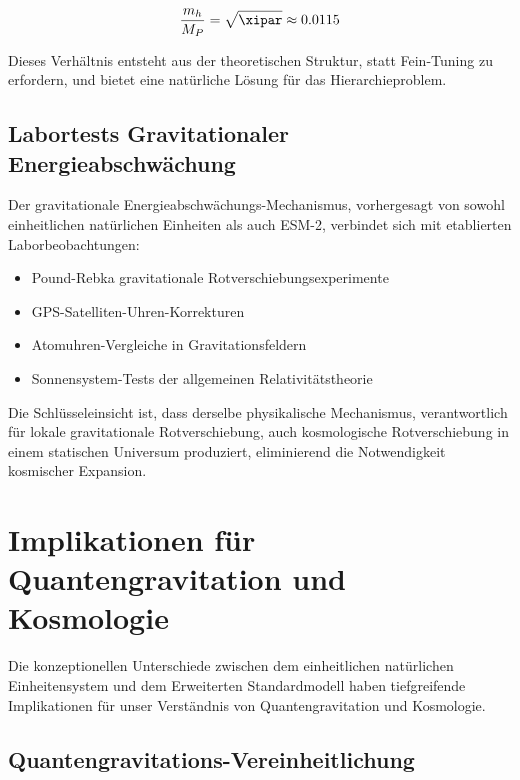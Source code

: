 	\begin{equation}
		\frac{m_h}{M_P} = \sqrt{\xipar} \approx 0.0115
	\end{equation}
	
	Dieses Verhältnis entsteht aus der theoretischen Struktur, statt Fein-Tuning zu erfordern, und bietet eine natürliche Lösung für das Hierarchieproblem.
	
	\subsection{Labortests Gravitationaler Energieabschwächung}
	\label{subsec:laboratory_tests}
	
	Der gravitationale Energieabschwächungs-Mechanismus, vorhergesagt von sowohl einheitlichen natürlichen Einheiten als auch ESM-2, verbindet sich mit etablierten Laborbeobachtungen:
	
	\begin{itemize}
		\item Pound-Rebka gravitationale Rotverschiebungsexperimente
		\item GPS-Satelliten-Uhren-Korrekturen
		\item Atomuhren-Vergleiche in Gravitationsfeldern
		\item Sonnensystem-Tests der allgemeinen Relativitätstheorie
	\end{itemize}
	
	Die Schlüsseleinsicht ist, dass derselbe physikalische Mechanismus, verantwortlich für lokale gravitationale Rotverschiebung, auch kosmologische Rotverschiebung in einem statischen Universum produziert, eliminierend die Notwendigkeit kosmischer Expansion.
	
	\section{Implikationen für Quantengravitation und Kosmologie}
	\label{sec:implications}
	
	Die konzeptionellen Unterschiede zwischen dem einheitlichen natürlichen Einheitensystem und dem Erweiterten Standardmodell haben tiefgreifende Implikationen für unser Verständnis von Quantengravitation und Kosmologie.
	
	\subsection{Quantengravitations-Vereinheitlichung}
	\label{subsec:quantum_gravity_unification}
	
